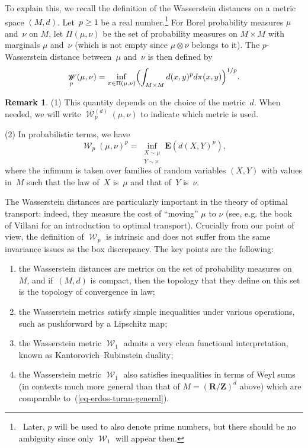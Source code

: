 \documentclass[12pt]{amsart}
\renewcommand{\mathcal}{\mathscr}
\renewcommand{\geq}{\geqslant}
\newcommand{\Zz}{\mathbf{Z}}
\newcommand{\Rr}{\mathbf{R}}
\newcommand{\expect}{\mathbf{E}}
\DeclareMathOperator{\wass}{\mathcal{W}}
\theoremstyle{plain}
\theoremstyle{remark}
\theoremstyle{definition}
\newtheorem{remark}[theorem]{Remark}
\renewcommand{\geq}{\geqslant}
\begin{document}
To explain this, we recall the definition of the Wasserstein distances
on a metric space $(M,d)$. Let~$p\geq 1$ be a real number.\footnote{\
  Later, $p$ will be used to also denote prime numbers, but there
  should be no ambiguity since only $\wass_1$ will appear then.}  For
Borel probability measures $\mu$ and~$\nu$ on $M$, let $\Pi(\mu,\nu)$
be the set of probability measures on $M\times M$ with marginals $\mu$
and~$\nu$ (which is not empty since $\mu\otimes\nu$ belongs to it).
The $p$-Wasserstein distance between~$\mu$ and~$\nu$ is then defined
by
\[
  \wass_p(\mu,\nu)=\inf_{\pi\in \Pi(\mu,\nu)}\Bigl(
  \int_{M \times M}d(x,y)^pd\pi(x,y)\Bigr)^{1/p}.
\]

\begin{remark}
  (1) This quantity depends on the choice of the metric~$d$. When
  needed, we will write $\wass_p^{(d)}(\mu,\nu)$ to indicate which
  metric is used.

  (2) In probabilistic terms, we have
  \[
    \wass_p(\mu,\nu)^p=\inf_{\substack{X\sim
        \mu\\Y\sim\nu}}\expect(d(X,Y)^p),
  \]
  where the infimum is taken over families of random variables $(X,Y)$
  with values in~$M$ such that the law of~$X$ is~$\mu$ and that of~$Y$
  is~$\nu$.
\end{remark}

The Wasserstein distances are particularly important in the theory of
optimal transport: indeed, they measure the cost of ``moving'' $\mu$
to $\nu$ (see, e.g. the book~\cite{villani} of Villani for an
introduction to optimal transport). Crucially from our point of view,
the definition of $\wass_p$ is intrinsic and does not suffer from the
same invariance issues as the box discrepancy. The key points are the
following:
\begin{enumerate}
\item the Wasserstein distances are metrics on the set of probability
  measures on~$M$, and if~$(M,d)$ is compact, then the topology that
  they define on this set is the topology of convergence in law;
\item the Wasserstein metrics satisfy simple inequalities under
  various operations, such as pushforward by a Lipschitz map;
\item the Wasserstein metric $\wass_1$ admits a very clean functional
  interpretation, known as Kantorovich--Rubinstein duality;
\item the Wasserstein metric $\wass_1$ also satisfies inequalities in
  terms of Weyl sums (in contexts much more general than that of
  $M=(\Rr/\Zz)^d$ above) which are comparable
  to~(\ref{eq-erdos-turan-general}).
\end{enumerate}
\end{document}

